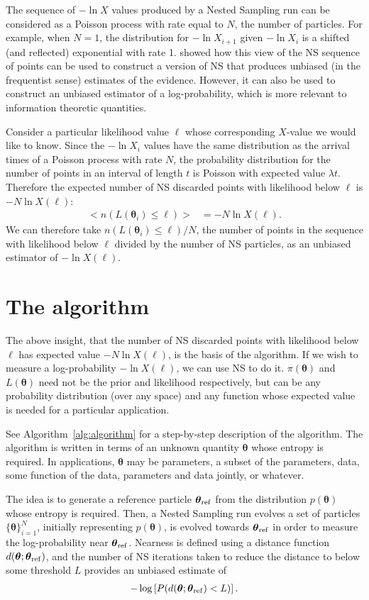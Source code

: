 \documentclass[entropy,article,accept,oneauthor,pdftex,10pt,a4paper]{mdpi}
\newcommand{\x}{\boldsymbol{\theta}}
\newcommand{\xref}{\x_{\rm ref}}
\begin{document}
The sequence of $-\ln X$ values produced by a Nested Sampling run can be
considered as a Poisson process with rate equal to $N$, the number of
particles. For example, when $N=1$, the distribution for $-\ln X_{i+1}$
given $-\ln X_i$ is a shifted (and reflected) exponential with rate 1.
\citet{Walter2015} showed how this view of the NS sequence of points
can be used to construct a
version of NS that produces unbiased (in the frequentist sense)
estimates of the evidence.
However, it can also be used to construct an unbiased estimator of
a log-probability, which is more relevant to information theoretic
quantities.

Consider a particular likelihood value $\ell$ whose corresponding $X$-value
we would like to know. Since the $-\ln X_i$ values have the same distribution
as the arrival times of a Poisson process with rate $N$, the probability
distribution for the number of points in an interval of length $t$ is
Poisson with expected value $\lambda t$. Therefore the expected number of
NS discarded points with likelihood below $\ell$ is $-N\ln X(\ell)$:
\begin{align}
\big< n(L(\x_i) \leq \ell) \big> &= -N\ln X(\ell).
\end{align}
We can therefore take $n(L(\x_i) \leq \ell)/N$, the number of points in the
sequence with likelihood below $\ell$ divided by the number of NS particles,
as an unbiased estimator of $-\ln X(\ell)$.

\section{The algorithm}

The above insight, that the number of NS discarded points with likelihood
below $\ell$ has expected value $-N\ln X(\ell)$, is the basis of the algorithm.
If we wish to measure a log-probability $-\ln X(\ell)$, we can use NS to do it.
$\pi(\x)$ and $L(\x)$ need not be the prior and likelihood respectively, but
can be any probability distribution (over any space) and any function whose
expected value is needed for a particular application.

See Algorithm~\ref{alg:algorithm} for a step-by-step description of the
algorithm. The algorithm is written in terms of an unknown quantity $\x$
whose entropy is required. In applications, $\x$ may be parameters,
a subset of the parameters, data, some function of the data,
parameters and data jointly, or whatever.

The idea is to generate a reference particle $\xref$
from the distribution $p(\x)$
whose entropy is required. Then, a Nested Sampling run evolves a set of
particles $\{\x\}_{i=1}^N$, initially representing $p(\x)$, is evolved
towards $\xref$ in order to measure the log-probability near
$\xref$. Nearness is defined using a distance function
$d(\x; \xref)$, and the number of NS iterations taken to reduce
the distance to below some threshold $L$ provides an unbiased estimate of
\begin{align}
   -\log \left[ P(d(\x; \xref) < L) \right].
\end{align}
\end{document}
